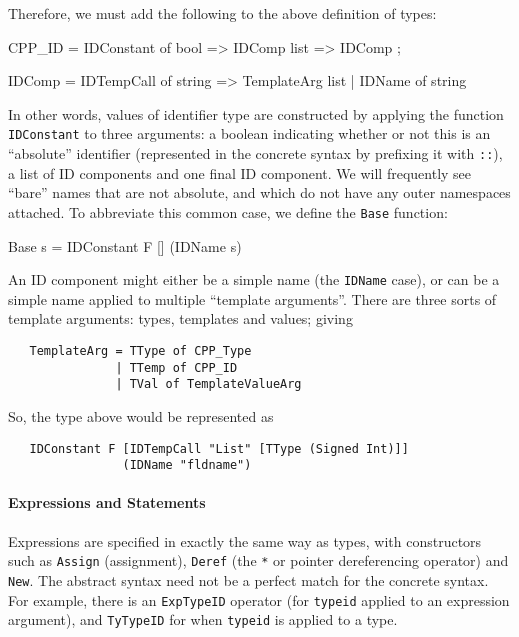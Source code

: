 \documentclass[11pt]{article}
\begin{document}
Therefore, we must add the following to the above definition of \cpp{}
types:
%
%
%
\begin{stdrule}
   CPP_ID = IDConstant of bool => IDComp list => IDComp ;

   IDComp = IDTempCall of string => TemplateArg list
          | IDName of string
\end{stdrule}
In other words, values of identifier type are constructed by applying
the function \texttt{IDConstant} to three arguments: a boolean
indicating whether or not this is an ``absolute'' identifier
(represented in the concrete syntax by prefixing it with \texttt{::}),
a list of ID components and one final ID component.  We will
frequently see ``bare'' names that are not absolute, and which do not
have any outer namespaces attached.  To abbreviate this common case, we
define the \texttt{Base} function:%
%
%
\begin{stdrule}
   Base s = IDConstant F [] (IDName s)
\end{stdrule}

An ID component might either be a simple name (the \texttt{IDName}
case), or can be a simple name applied to multiple ``template
arguments''.  There are three sorts of template arguments: types,
templates and values; giving
\begin{verbatim}
   TemplateArg = TType of CPP_Type
               | TTemp of CPP_ID
               | TVal of TemplateValueArg
\end{verbatim}
So, the type above would be represented as
\begin{verbatim}
   IDConstant F [IDTempCall "List" [TType (Signed Int)]]
                (IDName "fldname")
\end{verbatim}

\paragraph{Expressions and Statements}

Expressions are specified in exactly the same way as types, with
constructors such as \texttt{Assign} (assignment), \texttt{Deref} (the
\texttt{*} or pointer dereferencing operator) and \texttt{New}.  The
abstract syntax need not be a perfect match for the concrete syntax.
For example, there is an \texttt{ExpTypeID} operator (for
\texttt{typeid} applied to an expression argument), and
\texttt{TyTypeID} for when \texttt{typeid} is applied to a type.
\end{document}
